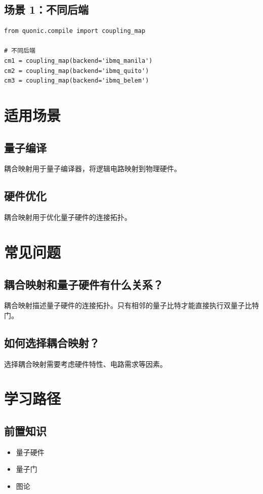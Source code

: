 \documentclass[12pt,a4paper]{article}
\begin{document}
\subsection{场景 1：不同后端}

\begin{verbatim}
from quonic.compile import coupling_map

# 不同后端
cm1 = coupling_map(backend='ibmq_manila')
cm2 = coupling_map(backend='ibmq_quito')
cm3 = coupling_map(backend='ibmq_belem')
\end{verbatim}

\section{适用场景}

\subsection{量子编译}

耦合映射用于量子编译器，将逻辑电路映射到物理硬件。

\subsection{硬件优化}

耦合映射用于优化量子硬件的连接拓扑。

\section{常见问题}

\subsection{耦合映射和量子硬件有什么关系？}

耦合映射描述量子硬件的连接拓扑。只有相邻的量子比特才能直接执行双量子比特门。

\subsection{如何选择耦合映射？}

选择耦合映射需要考虑硬件特性、电路需求等因素。

\section{学习路径}

\subsection{前置知识}
\begin{itemize}
  \item 量子硬件
  \item 量子门
  \item 图论
\end{itemize}
\end{document}
